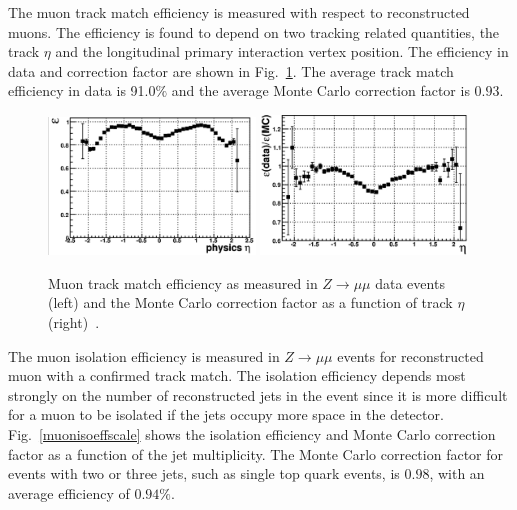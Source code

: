 The muon track match efficiency is measured with respect to reconstructed muons. The efficiency is found to depend on two tracking related quantities, the track $\eta$ and the longitudinal primary interaction vertex position. The efficiency in data and correction factor are shown in Fig.~\ref{muontrackeffscale}. The average track match efficiency in data is 91.0$\%$ and the average Monte Carlo correction factor is $0.93$.

\begin{figure}[!h!tbp]
\begin{center}
\includegraphics[width=0.49\textwidth]{eps/Reco/muontrack.eps}
\includegraphics[width=0.49\textwidth]{eps/Reco/muontrackscale.eps}
\end{center}
\vspace{-0.1in}
\caption{Muon track match efficiency as measured in $Z\rightarrow \mu\mu$ data events (left) and the Monte Carlo correction factor as a function of track $\eta$ (right)~\cite{muon}.}
\label{muontrackeffscale}
\end{figure}

The muon isolation efficiency is measured in $Z\rightarrow\mu\mu$ events for reconstructed muon with a confirmed track match. The isolation efficiency depends most strongly on the number of reconstructed jets in the event since it is more difficult for a muon to be isolated if the jets occupy more space in the detector. Fig.~\ref{muonisoeffscale} shows the isolation efficiency and Monte Carlo correction factor as a function of the jet multiplicity. The Monte Carlo correction factor for events with two or three jets, such as single top quark events, is $0.98$, with an average efficiency of $0.94\%$.

